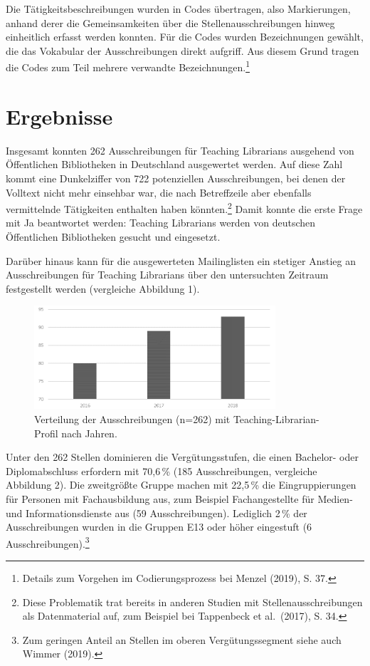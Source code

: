 \documentclass[a4paper,
fontsize=11pt,
oneside,
numbers=noperiodatend,
parskip=half-,
bibliography=totoc,
final
]{scrartcl}
\begin{document}
Die Tätigkeitsbeschreibungen wurden in Codes übertragen, also
Markierungen, anhand derer die Gemeinsamkeiten über die
Stellenausschreibungen hinweg einheitlich erfasst werden konnten. Für
die Codes wurden Bezeichnungen gewählt, die das Vokabular der
Ausschreibungen direkt aufgriff. Aus diesem Grund tragen die Codes zum
Teil mehrere verwandte Bezeichnungen.\footnote{Details zum Vorgehen im
  Codierungsprozess bei Menzel (2019), S. 37.}

\hypertarget{ergebnisse}{%
\section{Ergebnisse}\label{ergebnisse}}

Insgesamt konnten 262 Ausschreibungen für Teaching Librarians ausgehend
von Öffentlichen Bibliotheken in Deutschland ausgewertet werden. Auf
diese Zahl kommt eine Dunkelziffer von 722 potenziellen Ausschreibungen,
bei denen der Volltext nicht mehr einsehbar war, die nach Betreffzeile
aber ebenfalls vermittelnde Tätigkeiten enthalten haben
könnten.\footnote{Diese Problematik trat bereits in anderen Studien mit
  Stellenausschreibungen als Datenmaterial auf, zum Beispiel bei
  Tappenbeck et al.~(2017), S. 34.} Damit konnte die erste Frage mit Ja
beantwortet werden: Teaching Librarians werden von deutschen
Öffentlichen Bibliotheken gesucht und eingesetzt.

Darüber hinaus kann für die ausgewerteten Mailinglisten ein stetiger
Anstieg an Ausschreibungen für Teaching Librarians über den untersuchten
Zeitraum festgestellt werden (vergleiche Abbildung 1).

\begin{figure}
\centering
\includegraphics[width=0.8\textwidth]{img/image1.png}
\caption{Verteilung der Ausschreibungen (n=262) mit
Teaching-Librarian-Profil nach Jahren.}
\end{figure}

Unter den 262 Stellen dominieren die Vergütungsstufen, die einen
Bachelor- oder Diplomabschluss erfordern mit 70,6\,\% (185
Ausschreibungen, vergleiche Abbildung 2). Die zweitgrößte Gruppe machen
mit 22,5\,\% die Eingruppierungen für Personen mit Fachausbildung aus,
zum Beispiel Fachangestellte für Medien- und Informationsdienste aus (59
Ausschreibungen). Lediglich 2\,\% der Ausschreibungen wurden in die
Gruppen E13 oder höher eingestuft (6 Ausschreibungen).\footnote{Zum
  geringen Anteil an Stellen im oberen Vergütungssegment siehe auch
  Wimmer (2019).}
\end{document}
